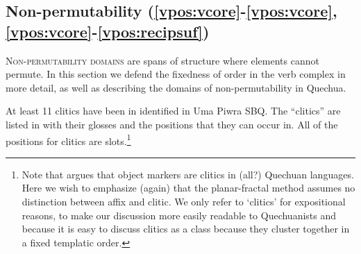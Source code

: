\documentclass[output=paper]{langscibook}
\begin{document}









\subsection{Non-permutability (\ref{vpos:vcore}-\ref{vpos:vcore}, \ref{vpos:vcore}-\ref{vpos:recipsuf})}

\label{sbq:sec:non-permutability}

\textsc{Non-permutability domains} are spans of structure where elements cannot permute. In this section we defend the fixedness of order in the verb complex in more detail, as well as describing the domains of non-permutability in Quechua. 


At least 11 clitics have been in identified in Uma Piwra SBQ. The ``clitics'' are listed in  with their glosses and the positions that they can occur in. All of the positions for clitics are slots.\footnote{Note that \citet{myler2017} argues that object markers are clitics in (all?) Quechuan languages. Here we wish to emphasize (again) that the planar-fractal method assumes no distinction between affix and clitic. We only refer to `clitics' for expositional reasons, to make our discussion more easily readable to Quechuanists and because it is easy to discuss clitics as a class because they cluster together in a fixed templatic order.}
\end{document}
